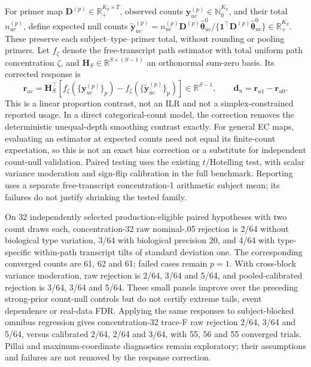 \documentclass[11pt]{article}
\begin{document}
For primer map \(\mathbf D^{(p)}\in\mathbb R_+^{K_p\times T}\), observed counts \(\mathbf y_{uc}^{(p)}\in\mathbb N_0^{K_p}\), and their total \(n_{uc}^{(p)}\), define expected null counts \(\widetilde{\mathbf y}_{uc}^{(p)}=n_{uc}^{(p)}\mathbf D^{(p)}\widehat{\boldsymbol\theta}_{uc}^0/\{\mathbf1^\top\mathbf D^{(p)}\widehat{\boldsymbol\theta}_{uc}^0\}\in\mathbb R_+^{K_p}\). These preserve each subject--type--primer total, without rounding or pooling primers. Let \(f_\zeta\) denote the free-transcript path estimator with total uniform path concentration \(\zeta\), and \(\mathbf H_S\in\mathbb R^{S\times(S-1)}\) an orthonormal sum-zero basis. Its corrected response is \begin{equation}\mathbf r_{uc}=\mathbf H_S^\top\left[f_\zeta(\{\mathbf y_{uc}^{(p)}\}_p)-f_\zeta(\{\widetilde{\mathbf y}_{uc}^{(p)}\}_p)\right]\in\mathbb R^{S-1},\qquad \mathbf d_u=\mathbf r_{u1}-\mathbf r_{u0}.\end{equation} This is a linear proportion contrast, not an ILR and not a simplex-constrained reported usage. In a direct categorical-count model, the correction removes the deterministic unequal-depth smoothing contrast exactly. For general EC maps, evaluating an estimator at expected counts need not equal its finite-count expectation, so this is not an exact bias correction or a substitute for independent count-null validation. Paired testing uses the existing \(t\)/Hotelling test, with scalar variance moderation and sign-flip calibration in the full benchmark. Reporting uses a separate free-transcript concentration-1 arithmetic subject mean; its failures do not justify shrinking the tested family.

On 32 independently selected production-eligible paired hypotheses with two count draws each, concentration-32 raw nominal-.05 rejection is 2/64 without biological type variation, 3/64 with biological precision 20, and 4/64 with type-specific within-path transcript tilts of standard deviation one. The corresponding converged counts are 61, 62 and 61; failed cases remain \(p=1\). With cross-block variance moderation, raw rejection is 2/64, 3/64 and 5/64, and pooled-calibrated rejection is 3/64, 3/64 and 5/64. These small panels improve over the preceding strong-prior count-null controls but do not certify extreme tails, event dependence or real-data FDR. Applying the same responses to subject-blocked omnibus regression gives concentration-32 trace-F raw rejection 2/64, 3/64 and 5/64, versus calibrated 2/64, 2/64 and 3/64, with 55, 56 and 55 converged trials. Pillai and maximum-coordinate diagnostics remain exploratory; their assumptions and failures are not removed by the response correction.
\end{document}
